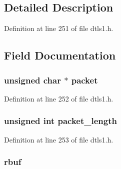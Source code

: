 \subsection{Detailed Description}


Definition at line 251 of file dtls1.\+h.



\subsection{Field Documentation}
\subsubsection[{\texorpdfstring{packet}{packet}}]{\setlength{\rightskip}{0pt plus 5cm}unsigned char $\ast$ packet}\hypertarget{structdtls1__record__data__st_a724f5bddffc45b222ae90da09d6c8628}{}\label{structdtls1__record__data__st_a724f5bddffc45b222ae90da09d6c8628}


Definition at line 252 of file dtls1.\+h.

\subsubsection[{\texorpdfstring{packet\+\_\+length}{packet_length}}]{\setlength{\rightskip}{0pt plus 5cm}unsigned int packet\+\_\+length}\hypertarget{structdtls1__record__data__st_adeb7e6beb692f86e02431fbd430d92a1}{}\label{structdtls1__record__data__st_adeb7e6beb692f86e02431fbd430d92a1}


Definition at line 253 of file dtls1.\+h.

\subsubsection[{\texorpdfstring{rbuf}{rbuf}}]{ rbuf}\hypertarget{structdtls1__record__data__st_a9a1d2af51256a2a27b1b5b12d3b8e6ee}{}\label{structdtls1__record__data__st_a9a1d2af51256a2a27b1b5b12d3b8e6ee}


